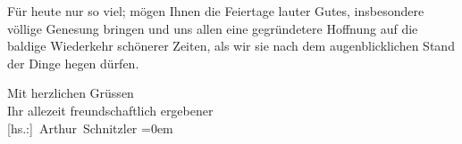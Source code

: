 \pstart
           Für heute nur so viel; mögen Ihnen die Feiertage lauter Gutes, insbesondere völlige
               Genesung bringen und uns allen eine gegründetere Hoffnung auf die baldige Wiederkehr
               schönerer Zeiten, als wir sie nach dem augenblicklichen Stand der Dinge hegen
               dürfen.\pend
           
\pstart
           Mit herzlichen Grüssen{\\[\baselineskip]}Ihr allezeit freundschaftlich ergebener{\\[\baselineskip]}\spacefill\mbox{{[}hs.:{]} Arthur Schnitzler}\pend
           \leftskip=0em{}\endnumbering{}  \newcommand{\dateiname}{L02224}\newcommand{\titel}{Arthur Schnitzler an Georg Brandes, 22. 12. 1915}\newcommand{\editorInnen}{Martin Anton Müller und Gerd-Hermann Susen}
